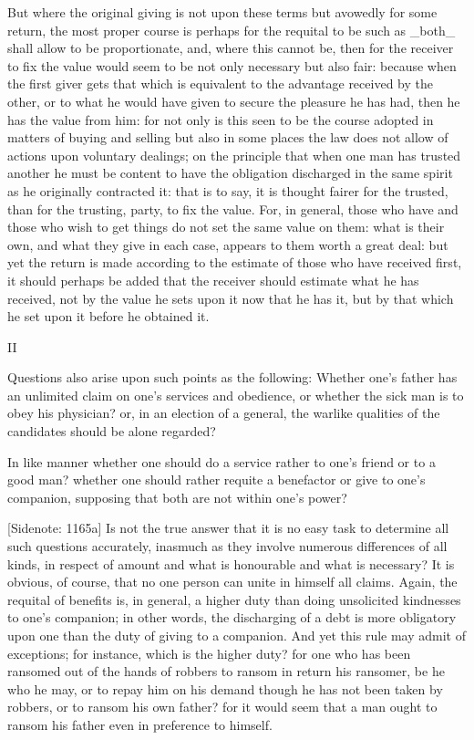 But where the original giving is not upon these terms but avowedly for
some return, the most proper course is perhaps for the requital to be
such as _both_ shall allow to be proportionate, and, where this cannot
be, then for the receiver to fix the value would seem to be not only
necessary but also fair: because when the first giver gets that which is
equivalent to the advantage received by the other, or to what he would
have given to secure the pleasure he has had, then he has the value from
him: for not only is this seen to be the course adopted in matters of
buying and selling but also in some places the law does not allow of
actions upon voluntary dealings; on the principle that when one man has
trusted another he must be content to have the obligation discharged in
the same spirit as he originally contracted it: that is to say, it is
thought fairer for the trusted, than for the trusting, party, to fix the
value. For, in general, those who have and those who wish to get things
do not set the same value on them: what is their own, and what they give
in each case, appears to them worth a great deal: but yet the return
is made according to the estimate of those who have received first, it
should perhaps be added that the receiver should estimate what he has
received, not by the value he sets upon it now that he has it, but by
that which he set upon it before he obtained it.


II

Questions also arise upon such points as the following: Whether one's
father has an unlimited claim on one's services and obedience, or
whether the sick man is to obey his physician? or, in an election of
a general, the warlike qualities of the candidates should be alone
regarded?

In like manner whether one should do a service rather to one's friend or
to a good man? whether one should rather requite a benefactor or give to
one's companion, supposing that both are not within one's power?

[Sidenote: 1165a] Is not the true answer that it is no easy task to
determine all such questions accurately, inasmuch as they involve
numerous differences of all kinds, in respect of amount and what is
honourable and what is necessary? It is obvious, of course, that no one
person can unite in himself all claims. Again, the requital of benefits
is, in general, a higher duty than doing unsolicited kindnesses to one's
companion; in other words, the discharging of a debt is more obligatory
upon one than the duty of giving to a companion. And yet this rule may
admit of exceptions; for instance, which is the higher duty? for one who
has been ransomed out of the hands of robbers to ransom in return his
ransomer, be he who he may, or to repay him on his demand though he has
not been taken by robbers, or to ransom his own father? for it would
seem that a man ought to ransom his father even in preference to
himself.

